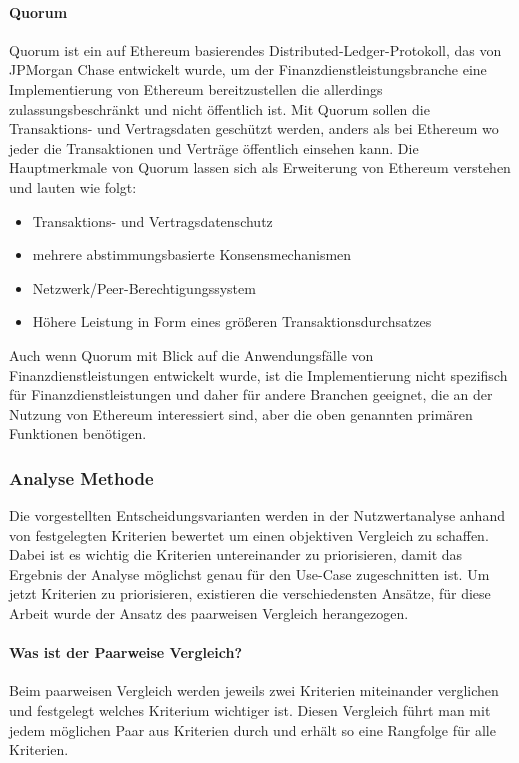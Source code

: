 \paragraph{Quorum}
Quorum ist ein auf Ethereum basierendes Distributed-Ledger-Protokoll, das von JPMorgan Chase entwickelt wurde, um der Finanzdienstleistungsbranche eine Implementierung von Ethereum bereitzustellen die allerdings zulassungsbeschränkt und nicht öffentlich ist. Mit Quorum sollen die Transaktions- und Vertragsdaten geschützt werden, anders als bei Ethereum wo jeder die Transaktionen und Verträge öffentlich einsehen kann. Die Hauptmerkmale von Quorum lassen sich als Erweiterung von Ethereum verstehen und lauten wie folgt:

\begin{itemize}
	\item Transaktions- und Vertragsdatenschutz
	\item mehrere abstimmungsbasierte Konsensmechanismen
	\item Netzwerk/Peer-Berechtigungssystem
	\item Höhere Leistung in Form eines größeren Transaktionsdurchsatzes
\end{itemize}

Auch wenn Quorum mit Blick auf die Anwendungsfälle von Finanzdienstleistungen entwickelt wurde, ist die Implementierung nicht spezifisch für Finanzdienstleistungen und daher für andere Branchen geeignet, die an der Nutzung von Ethereum interessiert sind, aber die oben genannten primären Funktionen benötigen.

\subsubsection{Analyse Methode}
Die vorgestellten Entscheidungsvarianten werden in der Nutzwertanalyse anhand von festgelegten Kriterien bewertet um einen objektiven Vergleich zu schaffen. Dabei ist es wichtig die Kriterien untereinander zu priorisieren, damit das Ergebnis der Analyse möglichst genau für den Use-Case zugeschnitten ist. Um jetzt Kriterien zu priorisieren, existieren die verschiedensten Ansätze, für diese Arbeit wurde der Ansatz des paarweisen Vergleich herangezogen.

\paragraph{Was ist der Paarweise Vergleich?}
Beim paarweisen Vergleich werden jeweils zwei Kriterien miteinander verglichen und festgelegt welches Kriterium wichtiger ist. Diesen Vergleich führt man mit jedem möglichen Paar aus Kriterien durch und erhält so eine Rangfolge für alle Kriterien.

